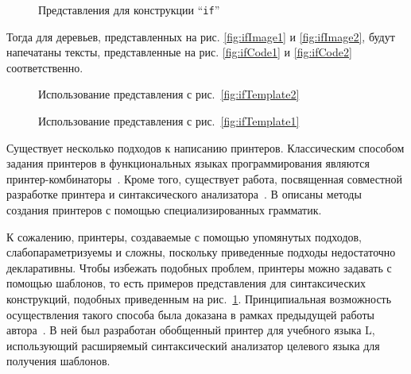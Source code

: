 \begin{figure}[h!]
	\subfloat[]{
		
		\label{fig:ifTemplate2}	
	}
	\quad
	\subfloat[]{
		
		\label{fig:ifTemplate1}	
	}
	\caption{Представления для конструкции “\lstinline{if}”}
	\label{fig:ifTemplateEx}	
\end{figure}


Тогда для деревьев, представленных на рис.
\ref{fig:ifImage1} и \ref{fig:ifImage2}, будут напечатаны тексты, представленные на
рис. \ref{fig:ifCode1} и \ref{fig:ifCode2} соответственно.

\begin{figure}[h!]
	\subfloat[]{
		\centering
		\texttt{[image: if1]}
		\label{fig:ifImage1}
	}
	\quad
	\subfloat[]{
		\centering
		
		\label{fig:ifCode1}	
	}

	\caption{Использование представления с рис.~\ref{fig:ifTemplate2}}
\end{figure}

\begin{figure}[h!]
	\subfloat[]{
		\centering
		\texttt{[image: if2]}
		\label{fig:ifImage2}
	}
	\quad
	\subfloat[]{
		\centering
		
		\label{fig:ifCode2}	
	}

	\caption{Использование представления с рис.~\ref{fig:ifTemplate1}}
\end{figure}

Существует несколько подходов к написанию принтеров.
Классическим способом задания принтеров в функциональных языках
программирования являются
принтер-комбинаторы~\cite{wadler, swierstra, swierstraChitil,
swierstra04, hughes, peytonJones, kiselyov, chitil, swiComb}.
Кроме того, существует работа, посвященная совместной разработке
принтера и синтаксического анализатора~\cite{rendelInvert}.
В \cite{jongeEveryOccasion, jongeReengine, brandBox} описаны методы
создания принтеров с помощью специализированных грамматик.

К сожалению, принтеры, создаваемые с помощью упомянутых подходов,
слабопараметризуемы и сложны, поскольку приведенные
подходы недостаточно декларативны. Чтобы избежать подобных проблем,
принтеры можно задавать с помощью шаблонов, то есть примеров представления для
синтаксических конструкций, подобных приведенным на рис.~\ref{fig:ifTemplateEx}.
Принципиальная возможность
осуществления такого способа была доказана в рамках предыдущей работы
автора~\cite{myCoursePaper}. В ней был разработан
обобщенный принтер для учебного языка L, использующий расширяемый
синтаксический анализатор целевого языка для получения шаблонов.

